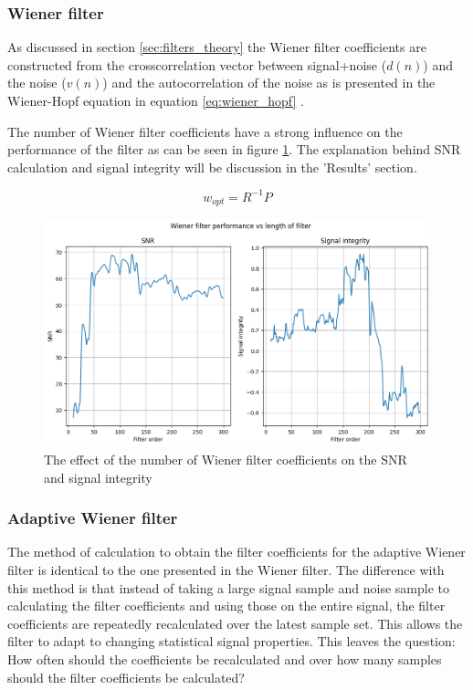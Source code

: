 \subsubsection{Wiener filter}
As discussed in section \ref{sec:filters_theory} the Wiener filter coefficients are constructed from the crosscorrelation vector between signal+noise ($d(n)$) and the noise ($v(n)$) and the autocorrelation of the noise as is presented in the Wiener-Hopf equation in equation \ref{eq:wiener_hopf} \cite{lecture_adaptive_filters_1}. 

The number of Wiener filter coefficients have a strong influence on the performance of the filter as can be seen in figure \ref{fig:wiener_filter_length}. The explanation behind SNR calculation and signal integrity will be discussion in the 'Results' section.

\begin{equation}
    w_{opt} = R^{-1}P
    \label{eq:wiener_hopf}
\end{equation}

\begin{figure}[h!t]
	\begin{center}
		\includegraphics[width=1.0\columnwidth]{images/wiener_filter_length.png}
	\end{center}
	\caption{The effect of the number of Wiener filter coefficients on the SNR and signal integrity}
	\label{fig:wiener_filter_length}
\end{figure}

\subsubsection{Adaptive Wiener filter}
The method of calculation to obtain the filter coefficients for the adaptive Wiener filter is identical to the one presented in the Wiener filter. The difference with this method is that instead of taking a large signal sample and noise sample to calculating the filter coefficients and using those on the entire signal, the filter coefficients are repeatedly recalculated over the latest sample set. This allows the filter to adapt to changing statistical signal properties. This leaves the question: How often should the coefficients be recalculated and over how many samples should the filter coefficients be calculated?

